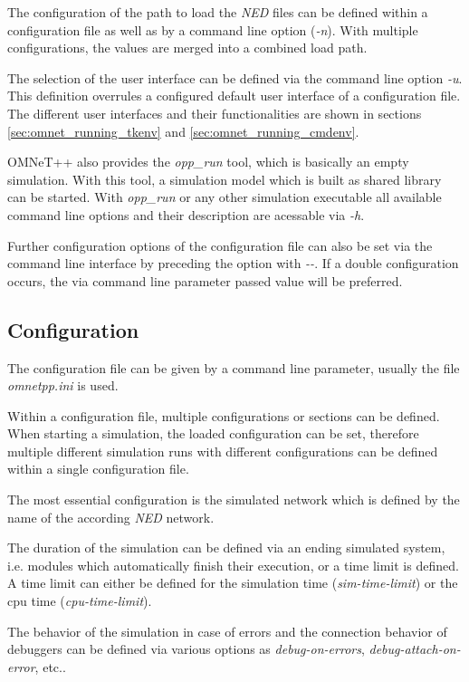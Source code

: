 The configuration of the path to load the \emph{NED} files can be defined within a configuration file as well as by a command line option (\emph{-n}).
With multiple configurations, the values are merged into a combined load path.

The selection of the user interface can be defined via the command line option \emph{-u}.
This definition overrules a configured default user interface of a configuration file.
The different user interfaces and their functionalities are shown in sections \ref{sec:omnet_running_tkenv} and \ref{sec:omnet_running_cmdenv}.

OMNeT++ also provides the \emph{opp\_run} tool, which is basically an empty simulation.
With this tool, a simulation model which is built as shared library can be started.
With \emph{opp\_run} or any other simulation executable all available command line options and their description are acessable via \emph{-h}.

Further configuration options of the configuration file can also be set via the command line interface by preceding the option with \emph{-{}-}.
If a double configuration occurs, the via command line parameter passed value will be preferred. \cite[section 10.1.1, section 10.1.2]{omnet_manual}

\subsection{Configuration}
\label{sec:omnet_running_config}
The configuration file can be given by a command line parameter, usually the file \emph{omnetpp.ini} is used.

Within a configuration file, multiple configurations or sections can be defined.
When starting a simulation, the loaded configuration can be set, therefore multiple different simulation runs with different configurations can be defined within a single configuration file. \cite[section 9.2]{omnet_manual}

The most essential configuration is the simulated network which is defined by the name of the according \emph{NED} network.

The duration of the simulation can be defined via an ending simulated system, i.e. modules which automatically finish their execution, or a time limit is defined.
A time limit can either be defined for the simulation time (\emph{sim-time-limit}) or the cpu time (\emph{cpu-time-limit}).

The behavior of the simulation in case of errors and the connection behavior of debuggers can be defined via various options as \emph{debug-on-errors}, \emph{debug-attach-on-error}, etc.. \cite[section 10.1.3]{omnet_manual}

